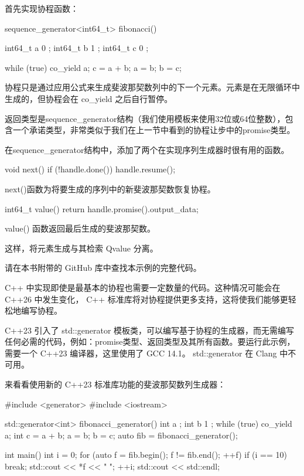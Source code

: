 首先实现协程函数：

\begin{cpp}
sequence_generator<int64_t> fibonacci() {
    int64_t a{ 0 };
    int64_t b{ 1 };
    int64_t c{ 0 };

    while (true) {
        co_yield a;
        c = a + b;
        a = b;
        b = c;
    }
}
\end{cpp}

协程只是通过应用公式来生成斐波那契数列中的下一个元素。元素是在无限循环中生成的，但协程会在 co\_yield 之后自行暂停。

返回类型是sequence\_generator结构（我们使用模板来使用32位或64位整数），包含一个承诺类型，非常类似于我们在上一节中看到的协程让步中的promise类型。

在sequence\_generator结构中，添加了两个在实现序列生成器时很有用的函数。

\begin{cpp}
void next() {
    if (!handle.done()) {
        handle.resume();
    }
}
\end{cpp}

next()函数为将要生成的序列中的新斐波那契数恢复协程。

\begin{cpp}
int64_t value() {
    return handle.promise().output_data;
}
\end{cpp}

value() 函数返回最后生成的斐波那契数。

这样，将元素生成与其检索 Qvalue 分离。

请在本书附带的 GitHub 库中查找本示例的完整代码。


C++ 中实现即使是最基本的协程也需要一定数量的代码。这种情况可能会在 C++26 中发生变化， C++ 标准库将对协程提供更多支持，这将使我们能够更轻松地编写协程。

C++23 引入了 std::generator 模板类，可以编写基于协程的生成器，而无需编写任何必需的代码，例如：promise类型、返回类型及其所有函数。要运行此示例，需要一个 C++23 编译器，这里使用了 GCC 14.1。 std::generator 在 Clang 中不可用。

来看看使用新的 C++23 标准库功能的斐波那契数列生成器：

\begin{cpp}
#include <generator>
#include <iostream>

std::generator<int> fibonacci_generator() {
    int a{ };
    int b{ 1 };
    while (true) {
        co_yield a;
        int c = a + b;
        a = b;
        b = c;
    }
}
auto fib = fibonacci_generator();

int main() {
    int i = 0;
    for (auto f = fib.begin(); f != fib.end(); ++f) {
        if (i == 10) {
            break;
        }
        std::cout << *f << " ";
        ++i;
    }
    std::cout << std::endl;
}
\end{cpp}


